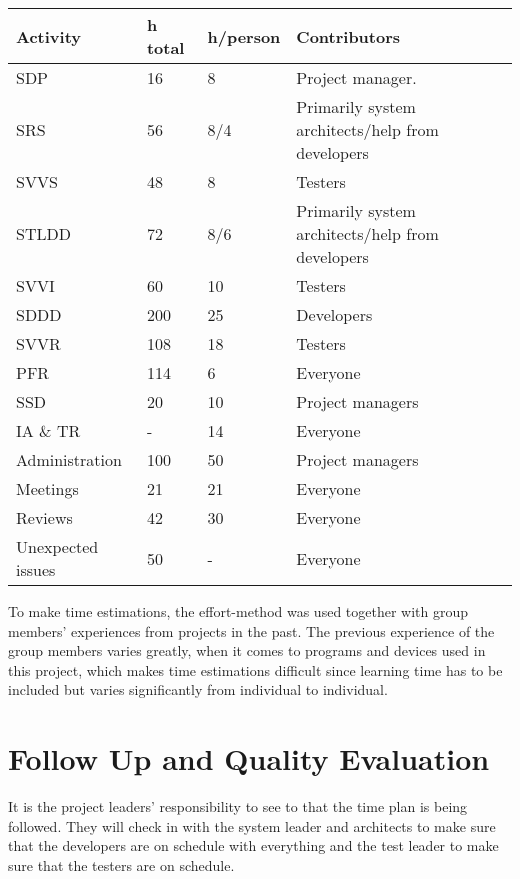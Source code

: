 \documentclass[a4paper]{article}
\begin{document}
\begin{center}
    \begin{tabular}{ | l | l | l | p{5cm} |}
    \hline
    \textbf{Activity} & \textbf{h total} & \textbf{h/person} & \textbf{Contributors} \\ \hline
    SDP & 16 & 8 & Project manager. \\ \hline
    SRS & 56 & 8/4 &  Primarily system architects/help from developers\\ \hline
    SVVS & 48 & 8 & Testers\\ \hline
    STLDD & 72 & 8/6 & Primarily system architects/help from developers\\ \hline
    SVVI & 60 & 10 & Testers\\ \hline
    SDDD & 200 & 25 & Developers\\ \hline
    SVVR & 108 & 18 & Testers\\ \hline
    PFR & 114 & 6 & Everyone\\ \hline
    SSD & 20 & 10 & Project managers\\ \hline
    IA \& TR & - & 14 & Everyone \\ \hline
    Administration & 100 & 50 & Project managers \\ \hline
    Meetings & 21 & 21 & Everyone \\ \hline
    Reviews & 42 & 30 & Everyone \\ \hline
    Unexpected issues & 50 & - & Everyone \\ \hline
    \end{tabular}
\end{center}

To make time estimations, the effort-method was used together with group members' experiences from projects in the past. The previous experience of the group members varies greatly, when it comes to programs and devices used in this project, which makes time estimations difficult since learning time has to be included but varies significantly from individual to individual.

\section{Follow Up and Quality Evaluation}

It is the project leaders' responsibility to see to that the time plan is being followed. They will check in with the system leader and architects to make sure that the developers are on schedule with everything and the test leader to make sure that the testers are on schedule.
\end{document}
